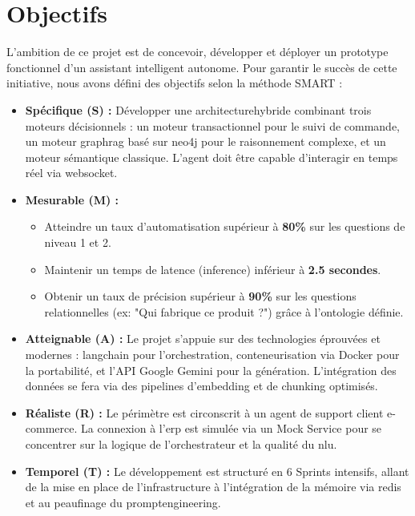 \section{Objectifs}

L'ambition de ce projet est de concevoir, développer et déployer un prototype fonctionnel d'un assistant intelligent autonome. Pour garantir le succès de cette initiative, nous avons défini des objectifs selon la méthode SMART :

\begin{itemize}
    \item \textbf{Spécifique (S) :}
    Développer une \gls{architecturehybride} combinant trois moteurs décisionnels : un moteur transactionnel pour le suivi de commande, un moteur \gls{graphrag} basé sur \gls{neo4j} pour le raisonnement complexe, et un moteur sémantique classique. L'agent doit être capable d'interagir en temps réel via \gls{websocket}.

    \item \textbf{Mesurable (M) :}
    \begin{itemize}
        \item Atteindre un taux d'automatisation supérieur à \textbf{80\%} sur les questions de niveau 1 et 2.
        \item Maintenir un temps de latence (\gls{inference}) inférieur à \textbf{2.5 secondes}.
        \item Obtenir un taux de précision supérieur à \textbf{90\%} sur les questions relationnelles (ex: "Qui fabrique ce produit ?") grâce à l'\gls{ontologie} définie.
    \end{itemize}

    \item \textbf{Atteignable (A) :}
    Le projet s'appuie sur des technologies éprouvées et modernes : \gls{langchain} pour l'orchestration, \gls{conteneurisation} via Docker pour la portabilité, et l'API Google Gemini pour la génération. L'intégration des données se fera via des pipelines d'\gls{embedding} et de \gls{chunking} optimisés.

    \item \textbf{Réaliste (R) :}
    Le périmètre est circonscrit à un agent de support client e-commerce. La connexion à l'\gls{erp} est simulée via un Mock Service pour se concentrer sur la logique de l'\gls{orchestrateur} et la qualité du \gls{nlu}.

    \item \textbf{Temporel (T) :}
    Le développement est structuré en 6 Sprints intensifs, allant de la mise en place de l'infrastructure à l'intégration de la mémoire via \gls{redis} et au peaufinage du \gls{promptengineering}.
\end{itemize}

